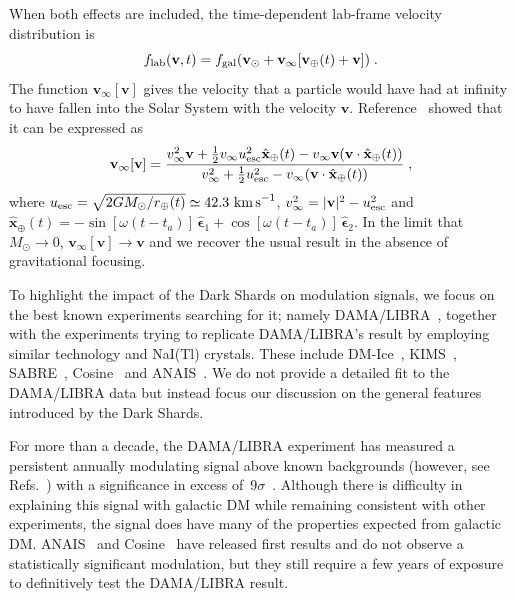 \documentclass[prd,10pt,twocolumn,showpacs,nofootinbib,aps,superscriptaddress,preprintnumbers]{revtex4-1}
\newcommand{\epsa}{\hat{\boldsymbol{\epsilon}}_1}
\newcommand{\epsb}{\hat{\boldsymbol{\epsilon}}_2}
\newcommand{\kms}{\textrm{ km \!s}^{-1}}
\begin{document}
  When both effects are included, the time-dependent lab-frame velocity
  distribution is
  \begin{equation}
  f_{\rm{lab}}(\mathbf{v},t)=f_{\rm{gal}} (\mathbf{v}_\odot +  \mathbf{v}_\infty[\mathbf{v}_\oplus(t) + \mathbf{v}])\;.
  \end{equation}
  The function $\mathbf{v}_\infty[\mathbf{v}]$ gives the velocity that a
  particle would have had at infinity to have fallen into the Solar
  System with the velocity $\mathbf{v}$. Reference~\cite{Alenazi:2006wu}
  showed that it can be expressed as
  \begin{equation}
  \mathbf{v}_\infty[\mathbf{v}] = \frac{v_\infty^2 \mathbf{v}+\frac{1}{2}v_\infty u_{\rm esc}^2 \hat{\mathbf{x}}_\oplus(t) - v_\infty \mathbf{v}(\mathbf{v}\cdot \hat{\mathbf{x}}_\oplus(t))}{v_\infty^2 + \frac{1}{2} u_{\rm esc}^2 - v_\infty(\mathbf{v}\cdot \hat{\mathbf{x}}_\oplus(t))}\;,
  \end{equation}
  where $u_{\rm esc} = \sqrt{2GM_\odot/r_\oplus(t)}\simeq 42.3 \kms$,
  $v_\infty^2 = |\mathbf{v}|^2 - u_{\rm esc}^2$ and
  $\hat{\mathbf{x}}_\oplus(t) = -\sin{\left[\omega(t-t_a)\right]}\, \epsa
 + \cos{\left[\omega (t-t_a)\right]\, \epsb}$. In the limit that
  $M_\odot \to 0$, $\mathbf{v}_\infty[\mathbf{v}] \to \mathbf{v}$ and we
  recover the usual result in the absence of gravitational focusing.

  To highlight the impact of the Dark Shards on modulation signals, we
  focus on the best known experiments searching for it; namely DAMA/LIBRA~\cite{Bernabei:2013xsa,Bernabei:2018yyw}, together with the
  experiments trying to replicate DAMA/LIBRA's result by employing
  similar technology and NaI(Tl) crystals.  These include
  DM-Ice~\cite{deSouza:2016fxg}, KIMS~\cite{Kim:2018wcl},
  SABRE~\cite{Froborg:2016ova},
  Cosine~\cite{Adhikari:2018ljm,Adhikari:2019off} and
  ANAIS~\cite{Amare:2018sxx, Amare:2019jul}.  We do not provide a
  detailed fit to the DAMA/LIBRA data but instead focus our discussion
  on the general features introduced by the Dark Shards.  
  
  For more than a decade, the DAMA/LIBRA experiment has measured a persistent annually
  modulating signal above known backgrounds (however, see
  Refs.~\cite{McKinsey:2018xdb, Ferenc:2019esv}) with a significance in
  excess of~$9\sigma$~\cite{Bernabei:2018yyw}.  Although there is
  difficulty in explaining this signal with galactic DM while remaining
  consistent with other experiments, the signal does have many of the
  properties expected from galactic DM.  ANAIS~\cite{Amare:2018sxx, Amare:2019jul} and Cosine~\cite{Adhikari:2018ljm,Adhikari:2019off} have released
  first results and do not observe a statistically significant modulation, but they still require a few years of exposure to definitively
  test the DAMA/LIBRA result.
\end{document}
